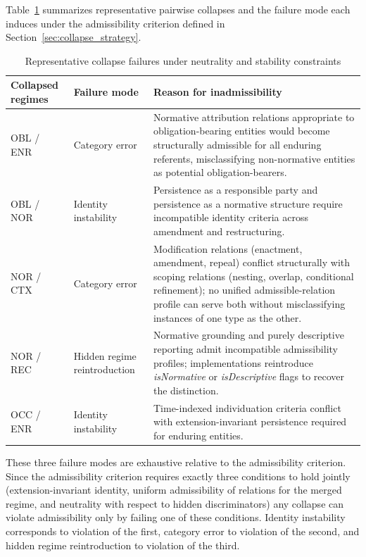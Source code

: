 Table~\ref{tab:collapse_summary} summarizes representative pairwise
collapses and the failure mode each induces under the admissibility
criterion defined in Section~\ref{sec:collapse_strategy}.

\clearpage
\begin{table}[!htb]
\centering
\caption{Representative collapse failures under neutrality and stability constraints}
\label{tab:collapse_summary}
\vspace{1.0em}
\begin{tabular}{@{} p{3.0cm} p{3.5cm} p{5.2cm}@{} }
\hline
\textbf{Collapsed regimes} & \textbf{Failure mode} & \textbf{Reason for inadmissibility} \\
\hline
OBL / ENR
& Category error
& Normative attribution relations appropriate to obligation-bearing entities would become structurally admissible for all enduring referents, misclassifying non-normative entities as potential obligation-bearers. \\
\hline
OBL / NOR
& Identity instability
& Persistence as a responsible party and persistence as a normative structure require incompatible identity criteria across amendment and restructuring. \\
\hline
NOR / CTX
& Category error
& Modification relations (enactment, amendment, repeal) conflict structurally with scoping relations (nesting, overlap, conditional refinement); no unified admissible-relation profile can serve both
without misclassifying instances of one type as the other. \\
\hline
NOR / REC
& Hidden regime reintroduction
& Normative grounding and purely descriptive reporting admit incompatible admissibility profiles; implementations reintroduce \emph{isNormative} or \emph{isDescriptive} flags to recover the distinction. \\
\hline
OCC / ENR
& Identity instability
& Time-indexed individuation criteria conflict with extension-invariant persistence required for enduring entities. \\
\hline
\end{tabular}
\vspace{1.0em}
\end{table}

These three failure modes are exhaustive
relative to the admissibility criterion.
Since the admissibility criterion requires
exactly three conditions to hold jointly
(extension-invariant identity,
uniform admissibility of relations for the merged regime,
and neutrality with respect to hidden discriminators)
any collapse can violate admissibility only by
failing one of these conditions.
Identity instability corresponds to violation of the first,
category error to violation of the second,
and hidden regime reintroduction to violation of the third.

